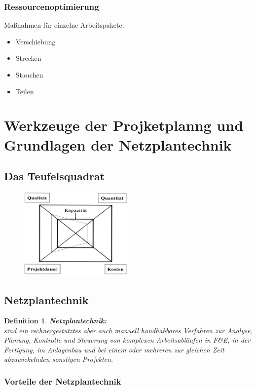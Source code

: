 \documentclass[11pt,a4paper]{article}
\newenvironment{de}[1]
{\begin{mdframed}[style=de]\begin{mydef}{\textbf{#1:}}\\} 
{\end{mydef}\end{mdframed}}
\newtheorem{mydef}{Definition}
\begin{document}
\subsubsection{Ressourcenoptimierung}
Maßnahmen für einzelne Arbeitspakete:
\begin{itemize}
\item Verschiebung
\item Strecken
\item Stauchen
\item Teilen
\end{itemize}
\pagebreak
\section{Werkzeuge der Projketplanng und Grundlagen der Netzplantechnik}
\subsection{Das Teufelsquadrat}

\begin{figure}[H]
	\includegraphics[width=0.5\textwidth]{ch9/teufelsquadrat}
\end{figure}

\subsection{Netzplantechnik}
\begin{de}{Netzplantechnik}
sind ein rechnergestütztes aber auch manuell handhabbares Verfahren zur Analyse,
Planung, Kontrolle und Steuerung von komplexen Arbeitsabläufen in F\&E, in der
Fertigung, im Anlagenbau und bei einem oder mehreren zur gleichen Zeit
abzuwickelnden sonstigen Projekten.
\end{de}

\subsubsection{Vorteile der Netzplantechnik}
\end{document}
